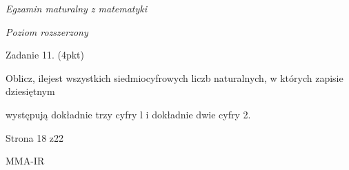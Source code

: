\documentclass[a4paper,12pt]{article}
\begin{document}
{\it Egzamin maturalny z matematyki}

{\it Poziom rozszerzony}

Zadanie 11. (4pkt)

Oblicz, ilejest wszystkich siedmiocyfrowych liczb naturalnych, w których zapisie dziesiętnym

występują dokładnie trzy cyfry l i dokładnie dwie cyfry 2.

Strona 18 z22

MMA-IR
\end{document}
